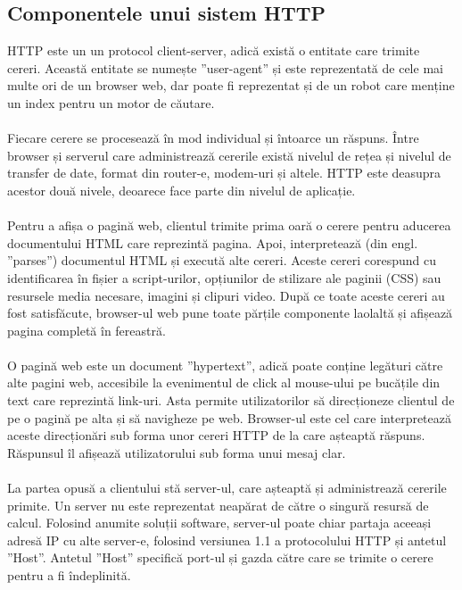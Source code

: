 \subsection{Componentele unui sistem HTTP}
HTTP este un un protocol client-server, adică există o entitate care trimite cereri. Această entitate se numește ”user-agent” și este reprezentată de cele mai multe ori de un browser web, dar poate fi reprezentat și de un robot care menține un index pentru un motor de căutare.
\\ \\
Fiecare cerere se procesează în mod individual și întoarce un răspuns. Între browser și serverul care administrează cererile există nivelul de rețea și nivelul de transfer de date, format din router-e, modem-uri și altele. HTTP este deasupra acestor două nivele, deoarece face parte din nivelul de aplicație.
\\ \\
Pentru a afișa o pagină web, clientul trimite prima oară o cerere pentru aducerea documentului HTML care reprezintă pagina. Apoi, interpretează (din engl. ”parses”) documentul HTML și execută alte cereri. Aceste cereri corespund cu identificarea în fișier a script-urilor, opțiunilor de stilizare ale paginii (CSS) sau resursele media necesare, imagini și clipuri video. După ce toate aceste cereri au fost satisfăcute, browser-ul web pune toate părțile componente laolaltă și afișează pagina completă în fereastră.
\\ \\
O pagină web este un document ”hypertext”, adică poate conține legături către alte pagini web, accesibile la evenimentul de click al mouse-ului pe bucățile din text care reprezintă link-uri. Asta permite utilizatorilor să direcționeze clientul de pe o pagină pe alta și să navigheze pe web. Browser-ul este cel care interpretează aceste direcționări sub forma unor cereri HTTP de la care așteaptă răspuns. Răspunsul îl afișează utilizatorului sub forma unui mesaj clar.
\\ \\
La partea opusă a clientului stă server-ul, care așteaptă și administrează cererile primite. Un server nu este reprezentat neapărat de către o singură resursă de calcul. Folosind anumite soluții software, server-ul poate chiar partaja aceeași adresă IP cu alte server-e, folosind versiunea 1.1 a protocolului HTTP și antetul ”Host”. Antetul ”Host” specifică port-ul și gazda către care se trimite o cerere pentru a fi îndeplinită.

